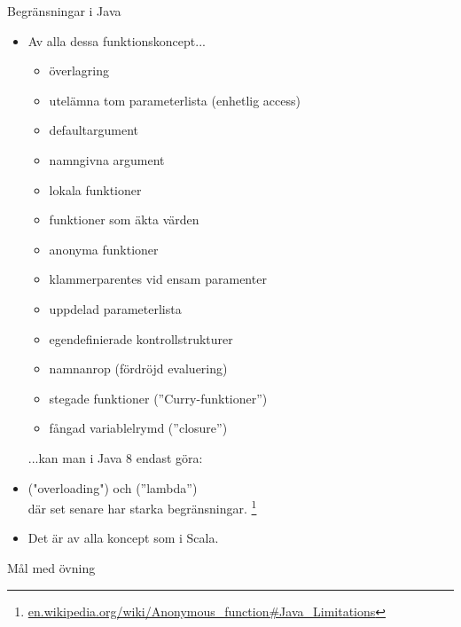 \begin{Slide}{Begränsningar i Java}\SlideFontTiny
\begin{itemize}
\item[] Av alla dessa funktionskoncept...
\begin{itemize}\SlideFontTiny
\item överlagring
\item utelämna tom parameterlista (enhetlig access)
\item defaultargument
\item namngivna argument
\item lokala funktioner
\item funktioner som äkta värden
\item anonyma funktioner
\item klammerparentes vid ensam paramenter
\item uppdelad parameterlista
\item egendefinierade kontrollstrukturer
\item namnanrop (fördröjd evaluering)
\item stegade funktioner (''Curry-funktioner'')
\item fångad variablelrymd (''closure'')
\end{itemize}
...kan man i Java 8 endast göra:
\item[]  ("overloading") och  (''lambda'') \\ där set senare har starka begränsningar. \footnote{\SlideFontTiny\href{https://en.wikipedia.org/wiki/Anonymous_function\#Java_Limitations}{en.wikipedia.org/wiki/Anonymous\_function\#Java\_Limitations}}
\item[] Det är  av alla koncept som  i Scala.
\end{itemize}


\end{Slide}

\begin{Slide}{Mål med övning \ExeWeekTHREE}
\begin{itemize}\SlideFontSmall
  
\end{itemize}
\end{Slide}



